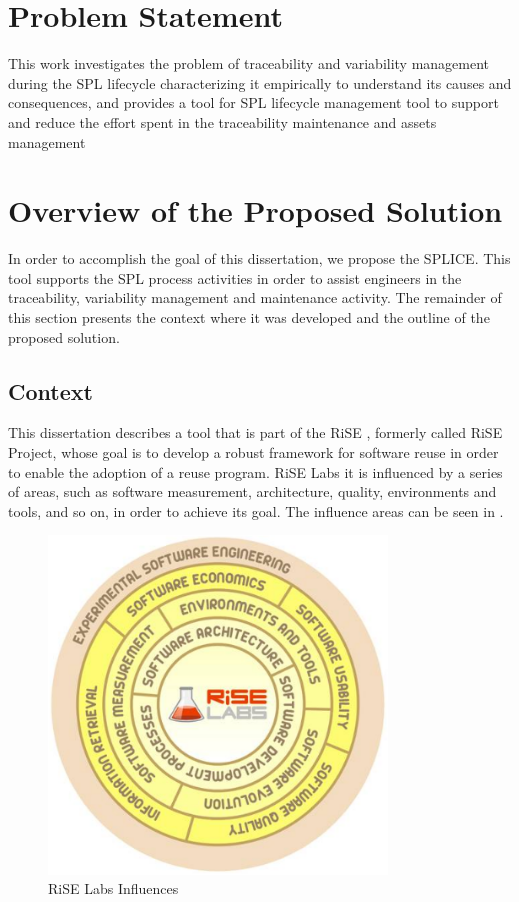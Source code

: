 \section{Problem Statement}
\label{sc:problem}
This work investigates the problem of traceability and variability management during the \acf{SPL} lifecycle characterizing it empirically to understand its causes and consequences, and provides a tool for \ac{SPL} lifecycle management tool to support and reduce the effort spent in the traceability maintenance and assets management


\section{Overview of the Proposed Solution}
\label{sc:solution}
In order to accomplish the goal of this dissertation, we propose the \acf{SPLICE}.
This tool supports the \acf{SPL} process activities in order to assist engineers in the traceability, variability management and maintenance activity.
 The remainder of this section presents the context where it was developed and the outline of the proposed solution.


\subsection{Context}
This dissertation describes a tool that is part of the \ac{RiSE} \citep{Almeida2004}, formerly
called RiSE Project, whose goal is to develop a robust framework for software
reuse in order to enable the adoption of a reuse program. RiSE Labs it is
influenced by a series of areas, such as software measurement, architecture,
quality, environments and tools, and so on, in order to achieve its goal. The
influence areas can be seen in .

\begin{figure}[htp]
\begin{center}
  \includegraphics[width=9cm]{chapters/introduction/rise-spiral.png}
  \caption[RiSE Labs Influences]{RiSE Labs Influences}
  \label{fg:rise-spiral}
\end{center}
\end{figure}

